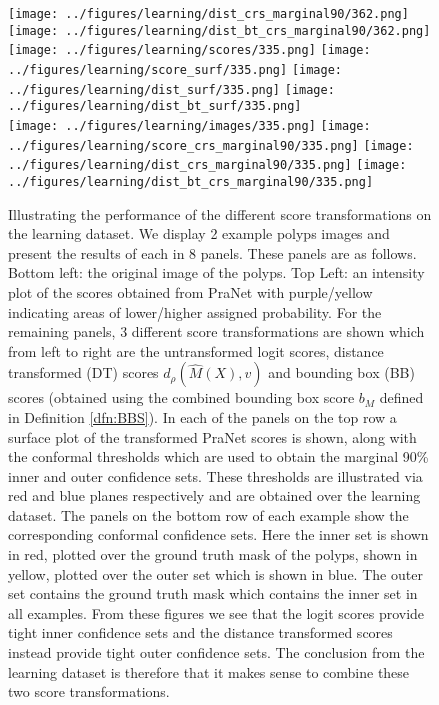 \begin{figure}[h!]
\begin{center}
	\texttt{[image: ../figures/learning/dist\_crs\_marginal90/362.png]}\hspace{0.3cm}
	\texttt{[image: ../figures/learning/dist\_bt\_crs\_marginal90/362.png]}\hspace{0.3cm}
		\texttt{[image: ../figures/learning/scores/335.png]}\hspace{0.3cm}
	\texttt{[image: ../figures/learning/score\_surf/335.png]}\hspace{0.3cm}	\texttt{[image: ../figures/learning/dist\_surf/335.png]}\hspace{0.3cm}
	\texttt{[image: ../figures/learning/dist\_bt\_surf/335.png]}\hspace{0.3cm}\\
	\texttt{[image: ../figures/learning/images/335.png]}\hspace{0.3cm}
	\texttt{[image: ../figures/learning/score\_crs\_marginal90/335.png]}\hspace{0.3cm}
	\texttt{[image: ../figures/learning/dist\_crs\_marginal90/335.png]}\hspace{0.3cm}
	\texttt{[image: ../figures/learning/dist\_bt\_crs\_marginal90/335.png]}
\end{center}
	\caption{Illustrating the performance of the different score transformations on the learning dataset. We display 2 example polyps images and present the results of each in 8 panels. These panels are as follows. Bottom left: the original image of the polyps. Top Left: an intensity plot of the scores obtained from PraNet with purple/yellow indicating areas of lower/higher assigned probability. For the remaining panels, 3 different score transformations are shown which from left to right are the untransformed logit scores, distance transformed (DT) scores $d_\rho(\hat{M}(X), v)$ and bounding box (BB) scores (obtained using the combined bounding box score $b_M$ defined in Definition \ref{dfn:BBS}). In each of the panels on the top row a surface plot of the transformed PraNet scores is shown, along with the conformal thresholds which are used to obtain the marginal 90\% inner and outer confidence sets.  These thresholds are illustrated via red and blue planes respectively and are obtained over the learning dataset. The panels on the bottom row of each example show the corresponding conformal confidence sets. Here the inner set is shown in red, plotted over the ground truth mask of the polyps, shown in yellow, plotted over the outer set which is shown in blue. The outer set contains the ground truth mask which contains the inner set in all examples. From these figures we see that the logit scores provide tight inner confidence sets and the distance transformed scores instead provide tight outer confidence sets.
The conclusion from the learning dataset is therefore that it makes sense to combine these two score transformations.}
	\label{fig:learning}
	\vspace{-0.5cm}
\end{figure}
